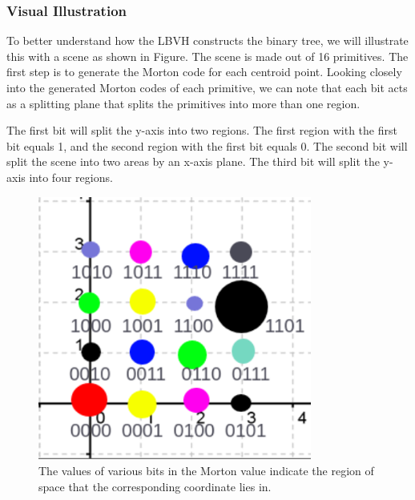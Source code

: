 \documentclass[11pt,a4paper]{article}
\begin{document}
\subsubsection{Visual Illustration}
To better understand how the LBVH constructs the binary tree, we will illustrate this with a scene as shown in Figure. The scene is made out of 16 primitives. The first step is to generate the Morton code for each centroid point. Looking closely into the generated Morton codes of each primitive, we can note that each bit acts as a splitting plane that splits the primitives into more than one region. 
\\
\noindent

The first bit will split the y-axis into two regions. The first region with the first bit equals 1, and the second region with the first bit equals 0. The second bit will split the scene into two areas by an x-axis plane. The third bit will split the y-axis into four regions.


\begin{figure}[H]	
     \centering
     \captionsetup{justification=centering,margin=2cm}
     \includegraphics[width=9cm]{images/example_lbvh/scene_2.png}
     \caption{The values of various bits in the Morton value indicate the region of space that the corresponding coordinate lies in. }
        \label{fig:dice}
\end{figure}
\end{document}
